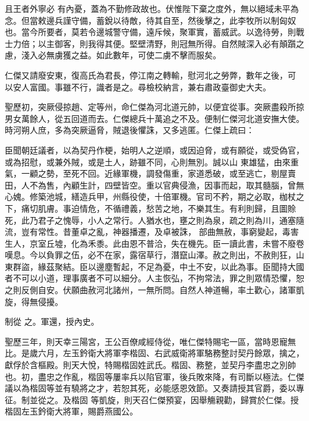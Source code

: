 \begin{pinyinscope}
 且王者外寧必
 有內憂，蓋為不勤修政故也。伏惟陛下棄之度外，無以絕域未平為念。但當敕邊兵謹守備，蓄銳以待敵，待其自至，然後擊之，此李牧所以制匈奴也。當今所要者，莫若令邊城警守備，遠斥候，聚軍實，蓄威武。以逸待勞，則戰士力倍；以主御客，則我得其便。堅壁清野，則冠無所得。自然賊深入必有顛躓之慮，淺入必無虜獲之益。如此數年，可使二虜不擊而服矣。



 仁傑又請廢安東，復高氏為君長，停江南之轉輸，慰河北之勞弊，數年之後，可
 以安人富國。事雖不行，識者是之。尋檢校納言，兼右肅政臺御史大夫。



 聖歷初，突厥侵掠趙、定等州，命仁傑為河北道元帥，以便宜從事。突厥盡殺所掠男女萬餘人，從五回道而去。仁傑總兵十萬追之不及。便制仁傑河北道安撫大使。時河朔人庶，多為突厥逼脅，賊退後懼誅，又多逃匿。仁傑上疏曰：



 臣聞朝廷議者，以為契丹作梗，始明人之逆順，或因迫脅，或有願從，或受偽官，或為招慰，或兼外賊，或是土人，跡雖不同，心則無別。誠以山
 東雄猛，由來重氣，一顧之勢，至死不回。近緣軍機，調發傷重，家道悉破，或至逃亡，剔屋賣田，人不為售，內顧生計，四壁皆空。重以官典侵漁，因事而起，取其髓腦，曾無心媿。修築池城，繕造兵甲，州縣役使，十倍軍機。官司不矜，期之必取，枷杖之下，痛切肌膚。事迫情危，不循禮義，愁苦之地，不樂其生。有利則歸，且圖賒死，此乃君子之愧辱，小人之常行。人猶水也，壅之則為泉，疏之則為川，通塞隨流，豈有常性。昔董卓之亂，神器播遷，及卓被誅，
 部曲無赦，事窮變起，毒害生人，京室丘墟，化為禾黍。此由恩不普洽，失在機先。臣一讀此書，未嘗不廢卷嘆息。今以負罪之伍，必不在家，露宿草行，潛竄山澤。赦之則出，不赦則狂，山東群盜，緣茲聚結。臣以邊塵暫起，不足為憂，中土不安，以此為事。臣聞持大國者不可以小道，理事廣者不可以細分。人主恢弘，不拘常法，罪之則眾情恐懼，恕之則反側自安。伏願曲赦河北諸州，一無所問。自然人神道暢，率土歡心，諸軍凱旋，得無侵擾。



 制從
 之。軍還，授內史。



 聖歷三年，則天幸三陽宮，王公百僚咸經侍從，唯仁傑特賜宅一區，當時恩寵無比。是歲六月，左玉鈐衛大將軍李楷固、右武威衛將軍駱務整討契丹餘眾，擒之，獻俘於含樞殿。則天大悅，特賜楷固姓武氏。楷固、務整，並契丹李盡忠之別帥也。初，盡忠之作亂，楷固等屢率兵以陷官軍，後兵敗來降，有司斷以極法。仁傑議以為楷固等並有驍將之才，若恕其死，必能感恩效節。又奏請授其官爵，委以專征。制並從之。及楷固
 等凱旋，則天召仁傑預宴，因舉觴親勸，歸賞於仁傑。授楷固左玉鈐衛大將軍，賜爵燕國公。




\end{pinyinscope}
